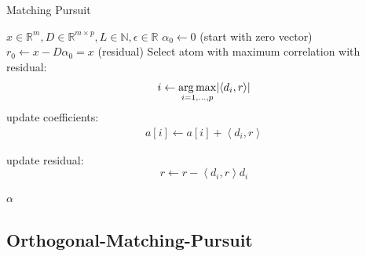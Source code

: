 \begin{algorithm}
\caption{Matching Pursuit}
\label{alg:mp}
\begin{algorithmic}[1]
\REQUIRE $x \in \mathbb{R}^m, D \in \mathbb{R}^{m\times p}, L \in \mathbb{N},
\epsilon \in \mathbb{R}$
\STATE $\alpha_0 \gets 0$ (start with zero vector)
\STATE $r_0 \gets x-D\alpha_0 = x$ (residual) 
\STATE Select atom with maximum correlation with residual: 
\begin{equation*}
i \gets \operatorname*{arg\,max}_{i=1,...,p} \lvert \left<d_i,r\right> \rvert
\end{equation*}
\STATE update coefficients: 
\begin{align}
a[i]  \gets a[i] + \left<d_i,r\right> \label{eq:mp_update}
\end{align}

\STATE update residual:
\begin{equation*}
 r \gets r - \left<d_i,r\right>d_i
\end{equation*}

\ENDWHILE
\RETURN $\alpha$
\end{algorithmic}
\end{algorithm}
\subsection{Orthogonal-Matching-Pursuit}
\label{sec:omp}

